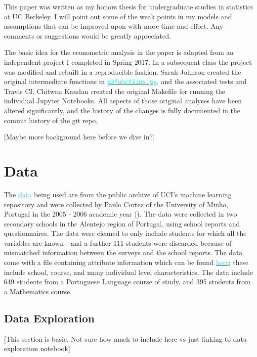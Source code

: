 \documentclass[12pt]{article}
\newcommand{\inlinecode}{\texttt}
\begin{document}
This paper was written as my honors thesis for undergraduate studies in statistics at UC Berkeley. I will point out some of the weak points in my models and assumptions that can be improved upon with more time and effort. Any comments or suggestions would be greatly appreciated. 

The basic idea for the econometric analysis in the paper is adapted from an independent project I completed in Spring 2017. In a subsequent class the project was modified and rebuilt in a reproducible fashion. Sarah Johnson created the original intermediate functions in \href{https://github.com/nadavtadelis/Reproducible_Metrics/blob/master/p3functions.py}{\textcolor{cyan}{\inlinecode{p3functions.py}}}, and the associated tests and Travis CI. Chitwan Kaudan created the original Makefile for running the individual Jupyter Notebooks. All aspects of those original analyses have been altered significantly, and the history of the changes is fully documented in the commit history of the git repo.

\textcolor{BrickRed}{[Maybe more background here before we dive in?]}


\newpage
\section{Data}
The \href{https://archive.ics.uci.edu/ml/datasets/Student+Performance#}{\textcolor{cyan}{data}} being used are from the public archive of UCI's machine learning repository and were collected by Paulo Cortez of the University of Minho, Portugal in the 2005 - 2006 academic year (\cite{data_paper}). The data were collected in two secondary schools in the Alentejo region of Portugal, using school reports and questionnaires. The data were cleaned to only include students for which all the variables are known - and a further 111 students were discarded because of mismatched information between the surveys and the school reports. The data come with a file containing attribute information which can be found \href{https://archive.ics.uci.edu/ml/datasets/Student+Performance#}{\textcolor{cyan}{here}}; these include school, course, and many individual level characteristics. The data include 649 students from a Portuguese Language course of study, and 395 students from a Mathematics course.

\subsection{Data Exploration}
\textcolor{BrickRed}{[This section is basic. Not sure how much to include here vs just linking to data exploration notebook]}
\end{document}

